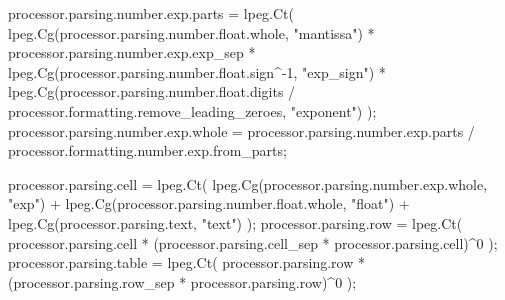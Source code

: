     processor.parsing.number.exp.parts = lpeg.Ct(
          lpeg.Cg(processor.parsing.number.float.whole, "mantissa")
        * processor.parsing.number.exp.exp_sep
        * lpeg.Cg(processor.parsing.number.float.sign^-1, "exp_sign")
        * lpeg.Cg(processor.parsing.number.float.digits / processor.formatting.remove_leading_zeroes, "exponent")
    );
    processor.parsing.number.exp.whole = processor.parsing.number.exp.parts / processor.formatting.number.exp.from_parts;

    processor.parsing.cell = lpeg.Ct(
          lpeg.Cg(processor.parsing.number.exp.whole, "exp")
        + lpeg.Cg(processor.parsing.number.float.whole, "float")
        + lpeg.Cg(processor.parsing.text, "text")
    );
    processor.parsing.row = lpeg.Ct(
        processor.parsing.cell * (processor.parsing.cell_sep * processor.parsing.cell)^0
    );
    processor.parsing.table = lpeg.Ct(
        processor.parsing.row * (processor.parsing.row_sep * processor.parsing.row)^0
    );

